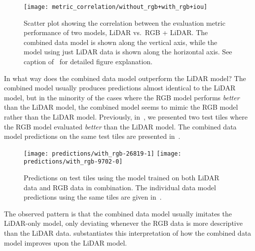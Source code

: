 \begin{figure}[H]
  \centering
  \texttt{[image: metric\_correlation/without\_rgb+with\_rgb+iou]}
  \caption{%
    Scatter plot showing the correlation between the evaluation metric performance of two models, LiDAR vs.\ RGB + LiDAR\@.
    The combined data model is shown along the vertical axis, while the model using just LiDAR data is shown along the horizontal axis.
    See caption of~ for detailed figure explanation.
  }%
  \label{fig:lidar-combined-correlation}
\end{figure}

In what way does the combined data model outperform the LiDAR model?
The combined model usually produces predictions almost identical to the LiDAR model, but in the minority of the cases where the RGB model performs \emph{better} than the LiDAR model, the combined model seems to mimic the RGB model rather than the LiDAR model.
Previously, in~, we presented two test tiles where the RGB model evaluated \emph{better} than the LiDAR model.
The combined data model predictions on the same test tiles are presented in~.

\begin{figure}[H]
  \centering
  \texttt{[image: predictions/with\_rgb-26819-1]}  %
  \textcolor{gray}{\vrule}
  \texttt{[image: predictions/with\_rgb-9702-0]}  %
  \caption{%
    Predictions on test tiles using the model trained on both LiDAR data and RGB data in combination.
    The individual data model predictions using the same tiles are given in~.
  }%
  \label{fig:rgb-selection}
\end{figure}

The observed pattern is that the combined data model usually imitates the LiDAR-only model, only deviating whenever the RGB data is more descriptive than the LiDAR data.
 substantiates this interpretation of how the combined data model improves upon the LiDAR model.

